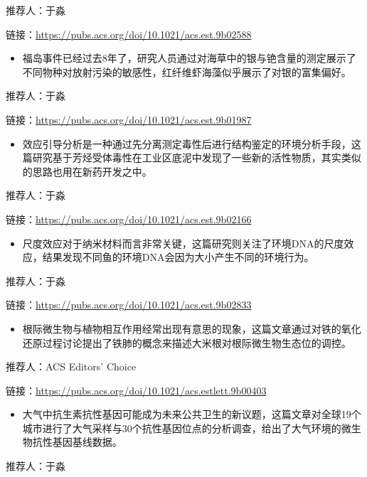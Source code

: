 \documentclass[
]{book}
\providecommand{\tightlist}{%
  \setlength{\itemsep}{0pt}\setlength{\parskip}{0pt}}
\begin{document}
推荐人：于淼

链接：\url{https://pubs.acs.org/doi/10.1021/acs.est.9b02588}

\begin{itemize}
\tightlist
\item
  福岛事件已经过去8年了，研究人员通过对海草中的银与铯含量的测定展示了不同物种对放射污染的敏感性，红纤维虾海藻似乎展示了对银的富集偏好。
\end{itemize}

推荐人：于淼

链接：\url{https://pubs.acs.org/doi/10.1021/acs.est.9b01987}

\begin{itemize}
\tightlist
\item
  效应引导分析是一种通过先分离测定毒性后进行结构鉴定的环境分析手段，这篇研究基于芳烃受体毒性在工业区底泥中发现了一些新的活性物质，其实类似的思路也用在新药开发之中。
\end{itemize}

推荐人：于淼

链接：\url{https://pubs.acs.org/doi/10.1021/acs.est.9b02166}

\begin{itemize}
\tightlist
\item
  尺度效应对于纳米材料而言非常关键，这篇研究则关注了环境DNA的尺度效应，结果发现不同鱼的环境DNA会因为大小产生不同的环境行为。
\end{itemize}

推荐人：于淼

链接：\url{https://pubs.acs.org/doi/10.1021/acs.est.9b02833}

\begin{itemize}
\tightlist
\item
  根际微生物与植物相互作用经常出现有意思的现象，这篇文章通过对铁的氧化还原过程讨论提出了铁肺的概念来描述大米根对根际微生物生态位的调控。
\end{itemize}

推荐人：ACS Editors' Choice

链接：\url{https://pubs.acs.org/doi/10.1021/acs.estlett.9b00403}

\begin{itemize}
\tightlist
\item
  大气中抗生素抗性基因可能成为未来公共卫生的新议题，这篇文章对全球19个城市进行了大气采样与30个抗性基因位点的分析调查，给出了大气环境的微生物抗性基因基线数据。
\end{itemize}

推荐人：于淼
\end{document}
